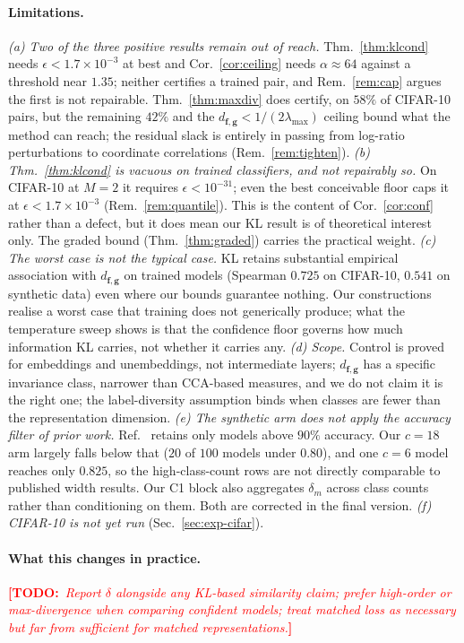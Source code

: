 \documentclass[10pt,letterpaper,twocolumn]{article}
\newcommand{\TODO}[1]{\textcolor{red}{\small\textbf{[TODO:}~\textit{#1}\textbf{]}}}
\newcommand{\bff}{\mathbf{f}}
\newcommand{\bfg}{\mathbf{g}}
\newcommand{\dfg}{d_{\bff,\bfg}}
\theoremstyle{plain}
\theoremstyle{definition}
\theoremstyle{remark}
\begin{document}
\paragraph{Limitations.}
\emph{(a) Two of the three positive results remain out of reach.}
Thm.~\ref{thm:klcond} needs $\epsilon<1.7\times10^{-3}$ at best and
Cor.~\ref{cor:ceiling} needs $\alpha\approx64$ against a threshold near
$1.35$; neither certifies a trained pair, and Rem.~\ref{rem:cap} argues the
first is not repairable. Thm.~\ref{thm:maxdiv} does certify, on $58\%$ of
CIFAR-10 pairs, but the remaining $42\%$ and the
$\dfg<1/(2\lambda_{\max})$ ceiling bound what the method can reach; the
residual slack is entirely in passing from log-ratio perturbations to
coordinate correlations (Rem.~\ref{rem:tighten}).
\emph{(b) Thm.~\ref{thm:klcond} is vacuous on trained classifiers, and not
repairably so.} On CIFAR-10 at $M=2$ it requires $\epsilon<10^{-31}$; even the
best conceivable floor caps it at $\epsilon<1.7\times10^{-3}$
(Rem.~\ref{rem:quantile}). This is the content of Cor.~\ref{cor:conf} rather
than a defect, but it does mean our KL result is of theoretical interest only.
The graded bound (Thm.~\ref{thm:graded}) carries the practical weight.
\emph{(c) The worst case is not the typical case.} KL retains substantial
empirical association with $\dfg$ on trained models (Spearman $0.725$ on
CIFAR-10, $0.541$ on synthetic data) even where our bounds guarantee nothing.
Our constructions realise a worst case that training does not generically
produce; what the temperature sweep shows is that the confidence floor governs
how much information KL carries, not whether it carries any.
\emph{(d) Scope.} Control is proved for embeddings and unembeddings, not
intermediate layers; $\dfg$ has a specific invariance class, narrower than
CCA-based measures, and we do not claim it is the right one; the
label-diversity assumption binds when classes are fewer than the representation
dimension.
\emph{(e) The synthetic arm does not apply the accuracy filter of prior work.}
Ref.~\cite{roeder2021} retains only models above $90\%$ accuracy. Our $c{=}18$
arm largely falls below that ($20$ of $100$ models under $0.80$), and one
$c{=}6$ model reaches only $0.825$, so the high-class-count rows are not
directly comparable to published width results. Our C1 block also aggregates
$\delta_{m}$ across class counts rather than conditioning on them.
Both are corrected in the final version.
\emph{(f) CIFAR-10 is not yet run} (Sec.~\ref{sec:exp-cifar}).

\paragraph{What this changes in practice.}
\TODO{Report $\delta$ alongside any KL-based similarity claim; prefer
high-order or max-divergence when comparing confident models; treat matched loss
as necessary but far from sufficient for matched representations.}
\end{document}
